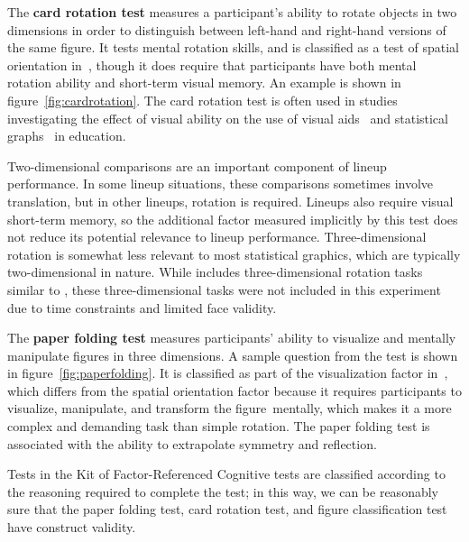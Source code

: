 \documentclass[journal]{vgtc}\usepackage[]{graphicx}\usepackage[]{color}
\begin{document}
The \textbf{card rotation test} measures a participant's ability to rotate objects in two dimensions in order to distinguish between left-hand and right-hand versions of the same figure. It tests mental rotation skills, and is classified as a test of spatial orientation in~\cite{ekstrom1976manual}, though it does require that participants have both mental rotation ability and short-term visual memory. An example is shown in figure~\ref{fig:cardrotation}. 
The card rotation test is often used in studies investigating the effect of visual ability on the use of visual aids~\cite{mayer1994whom} and statistical graphs~\cite{lowrie2007solving} in education.

Two-dimensional comparisons are an important component of lineup performance. In some lineup situations, these comparisons sometimes involve translation, but in other lineups, rotation is required. Lineups also require visual short-term memory, so the additional factor measured implicitly by this test does not reduce its potential relevance to lineup performance. 
Three-dimensional rotation is somewhat less relevant to most statistical graphics, which are typically two-dimensional in nature. While \cite{ekstrom1976manual} includes three-dimensional rotation tasks similar to \cite{shepard1971mental}, these three-dimensional tasks were not included in this experiment due to time constraints and limited face validity.

The \textbf{paper folding test} measures participants' ability to visualize and mentally manipulate figures in three dimensions. A sample question from the test is shown in figure~\ref{fig:paperfolding}. It is classified as part of the visualization factor in~\cite{ekstrom1976manual}, which differs from the spatial orientation factor because it requires participants to visualize, manipulate, and transform the figure~mentally, which makes it a more complex and demanding task than simple rotation. The paper folding test is associated with the ability to extrapolate symmetry and reflection.

Tests in the Kit of Factor-Referenced Cognitive tests are classified according to the reasoning required to complete the test; in this way, we can be reasonably sure that the paper folding test, card rotation test, and figure classification test have construct validity.
\end{document}
